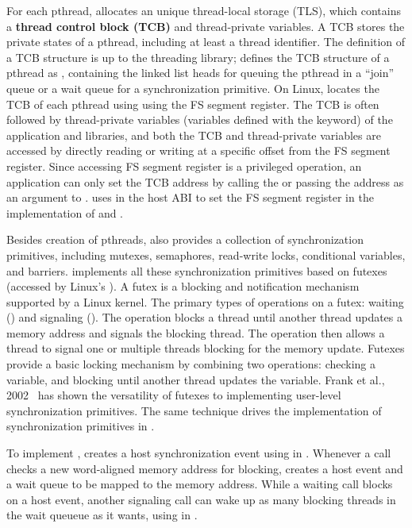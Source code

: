 For each pthread, \libpthread{} allocates an unique thread-local storage (TLS), which contains a {\bf thread control block (TCB)} and thread-private variables.
A TCB stores the private states of a pthread, including at least a thread identifier.
The definition of a TCB structure is up to the threading library;
\libpthread{} defines the TCB structure of a pthread as ,
containing the linked list heads for queuing the pthread
in a ``join'' queue or a wait queue for a synchronization primitive.
On \graphenearch{} Linux, \libpthread{}
locates the TCB of each pthread using using the FS segment register.
The TCB is often
followed by thread-private variables (variables defined with the  keyword) of the application
and libraries,
and both the TCB and thread-private variables
are accessed by directly reading or writing at a specific offset from the FS segment register.
Since accessing FS segment register is a privileged operation,
an application can only set the TCB address
by calling the  \linuxapi{} or passing the address as an argument to .
\thelibos{} uses  in the host ABI
to set the FS segment register
in the implementation of  and .


Besides creation of pthreads, \libpthread{} also provides a collection of synchronization primitives, including mutexes, semaphores, read-write locks, conditional variables, and barriers.
\libpthread{} implements all these synchronization primitives based on futexes (accessed by Linux's  \linuxapi{}). %
A futex is a blocking and notification mechanism
supported by a Linux kernel.
The primary types of operations on a futex: 
waiting () and signaling ().
The  operation
blocks a thread until another thread updates a memory address
and signals the blocking thread.
The  operation then allows a thread
to signal one or multiple threads blocking for the memory update.
Futexes provide a basic locking mechanism
by combining two operations: checking a variable, and blocking until
another thread updates the variable.
Frank et al., 2002~\cite{franke02futex} has shown the versatility of futexes
to implementing user-level synchronization primitives. The same technique drives the implementation of synchronization primitives in \libpthread{}.


To implement , \thelibos{} creates a host synchronization event using  in \thehostabi{}.
Whenever a  call checks a new word-aligned memory address for blocking, \thelibos{} creates a host event and a wait queue to be mapped to the memory address.
While a waiting  call blocks on a host event,
another signaling  call can wake up as many blocking threads in the wait queueue as it wants, using  in \thehostabi{}.


